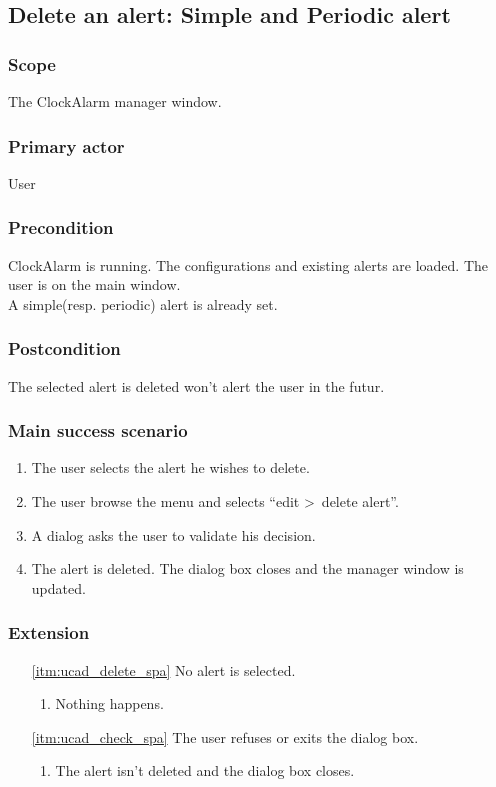 \subsection{Delete an alert: Simple and Periodic alert}

\subsubsection{Scope}
The ClockAlarm manager window.
\subsubsection{Primary actor}
User
\subsubsection{Precondition}
ClockAlarm is running. The configurations and existing alerts are loaded. The user is on the main window.
\\A simple(resp. periodic) alert is already set.
\subsubsection{Postcondition}
The selected alert is deleted won't alert the user in the futur.
\subsubsection{Main success scenario}
\begin{enumerate}
	\item The user selects the alert he wishes to delete.
	\item \label{itm:ucad_delete_spa} The user browse the menu and selects ``edit \textgreater~delete alert''.
	\item \label{itm:ucad_check_spa} A dialog asks the user to validate his decision.
	\item The alert is deleted. The dialog box closes and the manager window is updated.
\end{enumerate}
\subsubsection{Extension}
\begin{enumerate}
	\item[\ref{itm:ucad_delete_spa}] No alert is selected.
	\begin{enumerate}[i]
		\item Nothing happens.
	\end{enumerate}
	
	\item[\ref{itm:ucad_check_spa}] The user refuses or exits the dialog box.
	\begin{enumerate}[i]
		\item The alert isn't deleted and the dialog box closes.
	\end{enumerate}
\end{enumerate}


